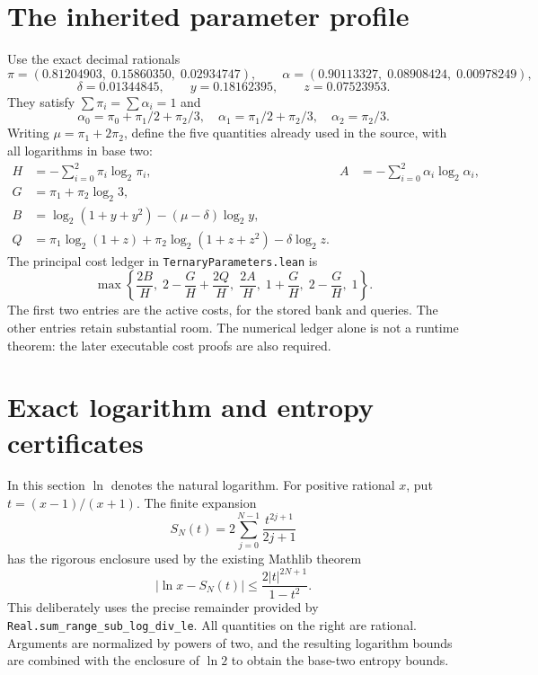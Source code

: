 \documentclass[11pt,a4paper]{article}
\begin{document}
\section{The inherited parameter profile}
Use the exact decimal rationals
\[
 \pi=(0.81204903,\;0.15860350,\;0.02934747),\qquad
 \alpha=(0.90113327,\;0.08908424,\;0.00978249),
\]
\[
 \delta=0.01344845,\qquad y=0.18162395,\qquad z=0.07523953.
\]
They satisfy $\sum\pi_i=\sum\alpha_i=1$ and
\[
 \alpha_0=\pi_0+\pi_1/2+\pi_2/3,\quad
 \alpha_1=\pi_1/2+\pi_2/3,\quad \alpha_2=\pi_2/3.
\]
Writing $\mu=\pi_1+2\pi_2$, define the five quantities already used in the
source, with all logarithms in base two:
\begin{align*}
 H&=-\sum_{i=0}^{2}\pi_i\log_2\pi_i,&
 A&=-\sum_{i=0}^{2}\alpha_i\log_2\alpha_i,\\
 G&=\pi_1+\pi_2\log_2 3,\\
 B&=\log_2(1+y+y^2)-(\mu-\delta)\log_2 y,\\
 Q&=\pi_1\log_2(1+z)+\pi_2\log_2(1+z+z^2)
       -\delta\log_2 z.
\end{align*}
The principal cost ledger in \texttt{TernaryParameters.lean} is
\begin{equation}\label{eq:ledger}
 \max\left\{\frac{2B}{H},\;
 2-\frac{G}{H}+\frac{2Q}{H},\;
 \frac{2A}{H},\;1+\frac{G}{H},\;2-\frac{G}{H},\;1\right\}.
\end{equation}
The first two entries are the active costs, for the stored bank and queries.
The other entries retain substantial room. The numerical ledger alone is
not a runtime theorem: the later executable cost proofs are also required.

\section{Exact logarithm and entropy certificates}
In this section $\ln$ denotes the natural logarithm. For positive rational
$x$, put $t=(x-1)/(x+1)$. The finite expansion
\[
 S_N(t)=2\sum_{j=0}^{N-1}\frac{t^{2j+1}}{2j+1}
\]
has the rigorous enclosure used by the existing Mathlib theorem
\[
 |\ln x-S_N(t)|\leq \frac{2|t|^{2N+1}}{1-t^2}.
\]
This deliberately uses the precise remainder provided by
\texttt{Real.sum\_range\_sub\_log\_div\_le}. All quantities on the right
are rational. Arguments are normalized by powers of two, and the resulting
logarithm bounds are combined with the enclosure of $\ln 2$ to obtain
the base-two entropy bounds.
\end{document}
